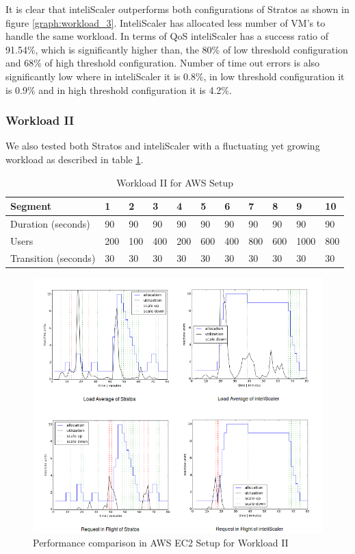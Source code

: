 It is clear that inteliScaler outperforms both configurations of Stratos as shown in figure \ref{graph:workload_3}. InteliScaler has allocated less number of VM's to handle the same workload. In terms of QoS inteliScaler has a success ratio of 91.54\%, which is significantly higher than, the 80\% of low threshold configuration and 68\% of high threshold configuration. Number of time out errors is also significantly low where in inteliScaler it is  0.8\%, in low threshold configuration it is 0.9\%  and in high threshold configuration it is  4.2\%. 

\pagebreak

\subsubsection{Workload II}
We also tested both Stratos and inteliScaler with a fluctuating yet growing workload as described in table \ref{table:workload_5}.
\begin{table}[h!]
\centering
\caption{Workload II for AWS Setup}
\label{table:workload_5}
\begin{tabular}{|l|l|l|l|l|l|l|l|l|l|l|}
\hline
Segment & 1 & 2 & 3 & 4 & 5 & 6 & 7 & 8 & 9 & 10\\ \hline
Duration (seconds) & 90 & 90 & 90 & 90 & 90 & 90 & 90 & 90 & 90 & 90 \\ \hline
Users & 200 & 100 & 400 & 200 & 600 & 400 & 800 & 600 & 1000 & 800   \\ \hline
Transition (seconds) & 30 & 30 & 30 & 30 & 30 & 30 & 30 & 30 & 30 & 30  \\ \hline
\end{tabular}
\end{table}
\begin{figure}[h!]
\centering
\includegraphics[width=500px]{figures/results_workload_5}
\caption{Performance comparison in AWS EC2 Setup for Workload II}
\label{graph:workload_5}
\end{figure}


